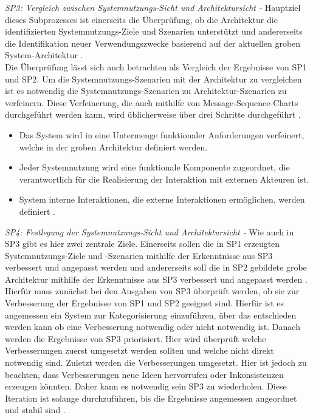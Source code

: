\emph{SP3: Vergleich zwischen Systemnutzungs-Sicht und Architektursicht -}
Hauptziel dieses Subprozesses ist einerseits die \"Uberpr\"ufung, ob die Architektur die identifizierten Systemnutzungs-Ziele und Szenarien unterst\"utzt und andererseits die Identifikation neuer Verwendungszwecke basierend auf der aktuellen groben System-Architektur \cite{Poh01}.\\

Die \"Uberpr\"ufung l\"asst sich auch betrachten als Vergleich der Ergebnisse von SP1 und SP2. Um die Systemnutzungs-Szenarien mit der Architektur zu vergleichen ist es notwendig die Systemnutzungs-Szenarien zu Architektur-Szenarien zu verfeinern. Diese Verfeinerung, die auch mithilfe von Message-Sequence-Charts durchgef\"uhrt werden kann, wird \"ublicherweise \"uber drei Schritte durchgef\"uhrt \cite{Poh01}.\\

\begin{itemize}
\item Das System wird in eine Untermenge funktionaler Anforderungen verfeinert, welche in der groben Architektur definiert werden.
\item Jeder Systemnutzung wird eine funktionale Komponente zugeordnet, die verantwortlich f\"ur die Realisierung der Interaktion mit externen Akteuren ist. 
\item System interne Interaktionen, die externe Interaktionen erm\"oglichen, werden definiert \cite{Poh01}.\\
\end{itemize}

\emph{SP4: Festlegung der Systemnutzungs-Sicht und Architektursicht -}
Wie auch in SP3 gibt es hier zwei zentrale Ziele. Einerseits sollen die in SP1 erzeugten Systemnutzungs-Ziele und -Szenarien mithilfe der Erkenntnisse aus SP3 verbessert und angepasst werden und andererseits soll die in SP2 gebildete grobe Architektur mithilfe der Erkenntnisse aus SP3 verbessert und angepasst werden \cite{Poh01}.\\

Hierf\"ur muss zun\"achst bei den Ausgaben von SP3 \"uberpr\"uft werden, ob sie zur Verbesserung der Ergebnisse von SP1 und SP2 geeignet sind. Hierf\"ur ist es angemessen ein System zur Kategorisierung einzuf\"uhren, \"uber das entschieden werden kann ob eine Verbesserung notwendig oder nicht notwendig ist. Danach werden die Ergebnisse von SP3 priorisiert. Hier wird \"uberpr\"uft welche Verbesserungen zuerst umgesetzt werden sollten und welche nicht direkt notwendig sind. Zuletzt werden die Verbesserungen umgesetzt. Hier ist jedoch zu beachten, dass Verbesserungen neue Ideen hervorrufen oder Inkonsistenzen erzeugen k\"onnten. Daher kann es notwendig sein SP3 zu wiederholen. Diese Iteration ist solange durchzuf\"uhren, bis die Ergebnisse angemessen angeordnet und stabil sind \cite{Poh01}.\\

